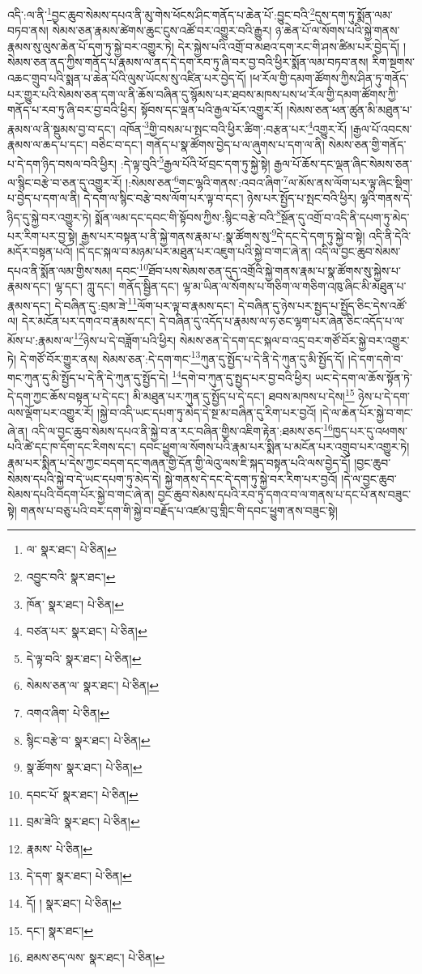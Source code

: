འདི་:ལ་ནི་\footnote{ལ་  སྣར་ཐང་།  པེ་ཅིན། }བྱང་ཆུབ་སེམས་དཔའ་ནི་མུ་གེས་ཕོངས་ཤིང་གནོད་པ་ཆེན་པོ་:བྱུང་བའི་\footnote{འབྱུང་བའི་  སྣར་ཐང་། }དུས་དག་ཏུ་སྨོན་ལམ་བཏབ་ནས། སེམས་ཅན་རྣམས་ཚེགས་ཆུང་ངུས་འཚོ་བར་འགྱུར་བའི་རྒྱུར། ཉ་ཆེན་པོ་ལ་སོགས་པའི་སྐྱེ་གནས་རྣམས་སུ་ལུས་ཆེན་པོ་དག་ཏུ་སྐྱེ་བར་འགྱུར་ཏེ། དེར་སྐྱེས་པའི་འགྲོ་བ་མཐའ་དག་རང་གི་ཤས་ཚིམ་པར་བྱེད་དོ། །སེམས་ཅན་ནད་ཀྱིས་གནོད་པ་རྣམས་ལ་ནད་དེ་དག་རབ་ཏུ་ཞི་བར་བྱ་བའི་ཕྱིར་སྨོན་ལམ་བཏབ་ནས། རིག་སྔགས་འཆང་གྲུབ་པའི་སྨན་པ་ཆེན་པོའི་ལུས་ཡོངས་སུ་འཛིན་པར་བྱེད་དོ། །ཕ་རོལ་གྱི་དམག་ཚོགས་ཀྱིས་ཤིན་ཏུ་གནོད་པར་གྱུར་པའི་སེམས་ཅན་དག་ལ་ནི་ཆོས་བཞིན་དུ་སྙོམས་པར་ཐབས་མཁས་པས་ཕ་རོལ་གྱི་དམག་ཚོགས་ཀྱི་གནོད་པ་རབ་ཏུ་ཞི་བར་བྱ་བའི་ཕྱིར། སྟོབས་དང་ལྡན་པའི་རྒྱལ་པོར་འགྱུར་རོ། །སེམས་ཅན་ཕན་ཚུན་མི་མཐུན་པ་རྣམས་ལ་ནི་སྡུམས་བྱ་བ་དང་། འཁོན་\footnote{ཁོན་  སྣར་ཐང་།  པེ་ཅིན། }གྱི་བསམ་པ་སྤང་བའི་ཕྱིར་ཚིག་:བརྩན་པར་\footnote{བཙན་པར་  སྣར་ཐང་།  པེ་ཅིན། }འགྱུར་རོ། །རྒྱལ་པོ་འབངས་རྣམས་ལ་ཆད་པ་དང་། བཅིང་བ་དང་། གནོད་པ་སྣ་ཚོགས་བྱེད་པ་ལ་ཞུགས་པ་དག་ལ་ནི། སེམས་ཅན་གྱི་གནོད་པ་དེ་དག་ཉིད་བསལ་བའི་ཕྱིར། :དེ་ལྟ་བུའི་\footnote{དེ་ལྟ་བའི་  སྣར་ཐང་།  པེ་ཅིན། }རྒྱལ་པོའི་ཕོ་བྲང་དག་ཏུ་སྐྱེ་སྟེ། རྒྱལ་པོ་ཆོས་དང་ལྡན་ཞིང་སེམས་ཅན་ལ་སྙིང་བརྩེ་བ་ཅན་དུ་འགྱུར་རོ། །:སེམས་ཅན་\footnote{སེམས་ཅན་ལ་  སྣར་ཐང་།  པེ་ཅིན། }གང་ལྷའི་གནས་:འབའ་ཞིག་\footnote{འགའ་ཞིག་  པེ་ཅིན། }ལ་མོས་ནས་ལོག་པར་ལྟ་ཞིང་སྡིག་པ་བྱེད་པ་དག་ལ་ནི། དེ་དག་ལ་སྙིང་བརྩེ་བས་ལོག་པར་ལྟ་བ་དང་། ཉེས་པར་སྤྱོད་པ་སྤང་བའི་ཕྱིར། ལྷའི་གནས་དེ་ཉིད་དུ་སྐྱེ་བར་འགྱུར་ཏེ། སྨོན་ལམ་དང་དབང་གི་སྟོབས་ཀྱིས་:སྙིང་བརྩེ་བའི་\footnote{སྙིང་བརྩེ་བ་  སྣར་ཐང་།  པེ་ཅིན། }སྔོན་དུ་འགྲོ་བ་འདི་ནི་དཔག་ཏུ་མེད་པར་རིག་པར་བྱ་སྟེ། རྒྱས་པར་བསྟན་པ་ནི་སྐྱེ་གནས་རྣམ་པ་:སྣ་ཚོགས་སུ་\footnote{སྣ་ཚོགས་  སྣར་ཐང་།  པེ་ཅིན། }དེ་དང་དེ་དག་ཏུ་སྐྱེ་བ་སྟེ། འདི་ནི་དེའི་མདོར་བསྟན་པའོ། །དེ་དང་སྐལ་བ་མཉམ་པར་མཐུན་པར་འཇུག་པའི་སྐྱེ་བ་གང་ཞེ་ན། འདི་ལ་བྱང་ཆུབ་སེམས་དཔའ་ནི་སྨོན་ལམ་གྱིས་སམ། དབང་\footnote{དབང་པོ་  སྣར་ཐང་།  པེ་ཅིན། }ཐོབ་པས་སེམས་ཅན་དུད་འགྲོའི་སྐྱེ་གནས་རྣམ་པ་སྣ་ཚོགས་སུ་སྐྱེས་པ་རྣམས་དང་། ལྷ་དང་། ཀླུ་དང་། གནོད་སྦྱིན་དང་། ལྷ་མ་ཡིན་ལ་སོགས་པ་གཅིག་ལ་གཅིག་འཁུ་ཞིང་མི་མཐུན་པ་རྣམས་དང་། དེ་བཞིན་དུ་:བྲམ་ཟེ་\footnote{བྲམ་ཟེའི་  སྣར་ཐང་།  པེ་ཅིན། }ལོག་པར་ལྟ་བ་རྣམས་དང་། དེ་བཞིན་དུ་ཉེས་པར་སྤྱད་པ་སྤྱོད་ཅིང་དེས་འཚོ་ལ། དེར་མངོན་པར་དགའ་བ་རྣམས་དང་། དེ་བཞིན་དུ་འདོད་པ་རྣམས་ལ་ཧ་ཅང་ལྷག་པར་ཞེན་ཅིང་འདོད་པ་ལ་མོས་པ་:རྣམས་ལ་\footnote{རྣམས་  པེ་ཅིན། }ཉེས་པ་དེ་བཟློག་པའི་ཕྱིར། སེམས་ཅན་དེ་དག་དང་སྐལ་བ་འདྲ་བར་གཙོ་བོར་སྐྱེ་བར་འགྱུར་ཏེ། དེ་གཙོ་བོར་གྱུར་ནས། སེམས་ཅན་:དེ་དག་གང་\footnote{དེ་དག་  སྣར་ཐང་།  པེ་ཅིན། }ཀུན་དུ་སྤྱོད་པ་དེ་ནི་དེ་ཀུན་དུ་མི་སྤྱོད་དོ། །དེ་དག་དགེ་བ་གང་ཀུན་དུ་མི་སྤྱོད་པ་དེ་ནི་དེ་ཀུན་དུ་སྤྱོད་དེ། \footnote{དོ། །   སྣར་ཐང་།  པེ་ཅིན། }དགེ་བ་ཀུན་དུ་སྤྱད་པར་བྱ་བའི་ཕྱིར། ཡང་དེ་དག་ལ་ཆོས་སྟོན་ཏེ་དེ་དག་ཀྱང་ཆོས་བསྟན་པ་དེ་དང་། མི་མཐུན་པར་ཀུན་དུ་སྤྱོད་པ་དེ་དང་། ཐབས་མཁས་པ་དེས།\footnote{དང་།  སྣར་ཐང་། } ཉེས་པ་དེ་དག་ལས་ལྡོག་པར་འགྱུར་རོ། །སྐྱེ་བ་འདི་ཡང་དཔག་ཏུ་མེད་དེ་སྔ་མ་བཞིན་དུ་རིག་པར་བྱའོ། །དེ་ལ་ཆེན་པོར་སྐྱེ་བ་གང་ཞེ་ན། འདི་ལ་བྱང་ཆུབ་སེམས་དཔའ་ནི་སྐྱེ་བ་ན་རང་བཞིན་གྱིས་འཇིག་རྟེན་:ཐམས་ཅད་\footnote{ཐམས་ཅད་ལས་  སྣར་ཐང་།  པེ་ཅིན། }ཁྱད་པར་དུ་འཕགས་པའི་ཚེ་དང་ཁ་དོག་དང་རིགས་དང་། དབང་ཕྱུག་ལ་སོགས་པའི་རྣམ་པར་སྨིན་པ་མངོན་པར་འགྲུབ་པར་འགྱུར་ཏེ། རྣམ་པར་སྨིན་པ་དེས་ཀྱང་བདག་དང་གཞན་གྱི་དོན་གྱི་ལེའུ་ལས་ཇི་སྐད་བསྟན་པའི་ལས་བྱེད་དོ། །བྱང་ཆུབ་སེམས་དཔའི་སྐྱེ་བ་དེ་ཡང་དཔག་ཏུ་མེད་དེ། སྐྱེ་གནས་དེ་དང་དེ་དག་ཏུ་སྐྱེ་བར་རིག་པར་བྱའོ། །དེ་ལ་བྱང་ཆུབ་སེམས་དཔའི་བདག་པོར་སྐྱེ་བ་གང་ཞེ་ན། བྱང་ཆུབ་སེམས་དཔའི་རབ་ཏུ་དགའ་བ་ལ་གནས་པ་དང་པོ་ནས་བཟུང་སྟེ། གནས་པ་བཅུ་པའི་བར་དག་གི་སྐྱེ་བ་བརྗོད་པ་འཛམ་བུ་གླིང་གི་དབང་ཕྱུག་ནས་བཟུང་སྟེ། 